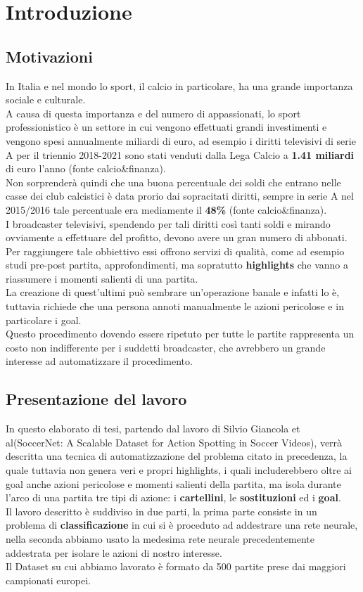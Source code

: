 \chapter{Introduzione}\label{ch:introduzione}
\section*{Motivazioni}
In Italia e nel mondo lo sport, il calcio in particolare, ha una grande importanza sociale e culturale.
\\A causa di questa importanza e del numero di appassionati, lo sport professionistico è un settore in cui vengono effettuati grandi investimenti e vengono spesi annualmente miliardi di euro, ad esempio i diritti televisivi di serie A per il triennio 2018-2021 sono stati venduti dalla Lega Calcio a \textbf{1.41 miliardi} di euro l'anno (fonte calcio\&finanza).
\\Non sorprenderà quindi che una buona percentuale dei soldi che entrano nelle casse dei club calcistici è data prorio dai sopracitati diritti, sempre in serie A nel 2015/2016 tale percentuale era mediamente il \textbf{48\%} (fonte calcio\&finanza).
\\I broadcaster televisivi, spendendo per tali diritti così tanti soldi e mirando ovviamente a effettuare del profitto, devono avere un gran numero di abbonati. Per raggiungere tale obbiettivo essi offrono servizi di qualità, come ad esempio studi pre-post partita, approfondimenti, ma sopratutto \textbf{highlights} che vanno a riassumere i momenti salienti di una partita. 
\\La creazione di quest'ultimi può sembrare un'operazione banale e infatti lo è, tuttavia richiede che una persona annoti manualmente le azioni pericolose e in particolare i goal.
\\Questo procedimento dovendo essere ripetuto per tutte le partite rappresenta un costo non indifferente per i suddetti broadcaster, che avrebbero un grande interesse ad automatizzare il procedimento.
\section*{Presentazione del lavoro}
In questo elaborato di tesi, partendo dal lavoro di Silvio Giancola et al(SoccerNet: A Scalable Dataset for Action Spotting in Soccer Videos), verrà descritta una tecnica di automatizzazione del problema citato in precedenza, la quale tuttavia non genera veri e propri highlights, i quali includerebbero oltre ai goal anche azioni pericolose e momenti salienti della partita, ma isola durante l'arco di una partita tre tipi di azione: i \textbf{cartellini}, le \textbf{sostituzioni} ed i \textbf{goal}.
\\Il lavoro descritto è suddiviso in due parti, la prima parte consiste in un problema di \textbf{classificazione} in cui si è proceduto ad addestrare una rete neurale, nella seconda abbiamo usato la medesima rete neurale precedentemente addestrata per isolare le azioni di nostro interesse.
\\Il Dataset su cui abbiamo lavorato è formato da 500 partite prese dai maggiori campionati europei.


